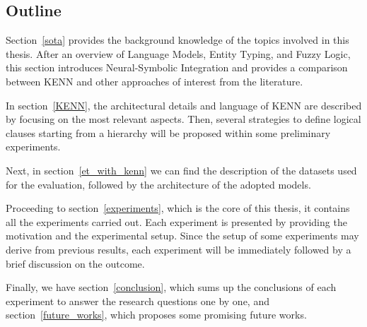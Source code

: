 \subsection{Outline}
Section~\ref{sota} provides the background knowledge of the topics involved in this thesis. After an overview of Language Models, Entity Typing, and Fuzzy Logic, this section introduces Neural-Symbolic Integration and provides a comparison between KENN and other approaches of interest from the literature. 

In section~\ref{KENN}, the architectural details and language of KENN are described by focusing on the most relevant aspects. Then, several strategies to define logical clauses starting from a hierarchy will be proposed within some preliminary experiments.

Next, in section~\ref{et_with_kenn} we can find the description of the datasets used for the evaluation, followed by the architecture of the adopted models.

Proceeding to section~\ref{experiments}, which is the core of this thesis, it contains all the experiments carried out. Each experiment is presented by providing the motivation and the experimental setup. Since the setup of some experiments may derive from previous results, each experiment will be immediately followed by a brief discussion on the outcome.

Finally, we have section~\ref{conclusion}, which sums up the conclusions of each experiment to answer the research questions one by one, and section~\ref{future_works}, which proposes some promising future works.




